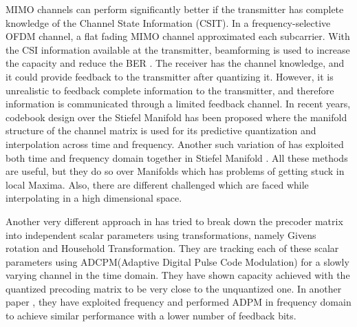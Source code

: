\documentclass[conference]{IEEEtran}
\begin{document}
MIMO channels can perform significantly better if the transmitter has complete knowledge of the Channel State Information (CSIT). In a frequency-selective OFDM channel, a flat fading MIMO channel approximated each subcarrier. With the CSI information available at the transmitter, beamforming is used to increase the capacity and reduce the BER \cite{love2008overview}. The receiver has the channel knowledge, and it could provide feedback to the transmitter after quantizing it. However, it is unrealistic to feedback complete information to the transmitter, and therefore information is communicated through a limited feedback channel. 
In recent years, codebook design over the Stiefel Manifold \cite{6891198} has been proposed where the manifold structure of the channel matrix is used for its predictive quantization and interpolation across time and frequency. Another such variation of \cite{6891198} has exploited both time and frequency domain together in Stiefel Manifold \cite{Gupt1905:Predictive}. All these methods are useful, but they do so over Manifolds which has problems of getting stuck in local Maxima. Also, there are different challenged which are faced while interpolating in a high dimensional space.

Another very different approach in \cite{4114278} has tried to break down the precoder matrix into independent scalar parameters using transformations, namely Givens rotation and Household Transformation. They are tracking each of these scalar parameters using ADCPM(Adaptive Digital Pulse Code Modulation) for a slowly varying channel in the time domain. They have shown capacity achieved with the quantized precoding matrix to be very close to the unquantized one. In another paper \cite{4556174}, they have exploited frequency and performed ADPM in frequency domain to achieve similar performance with a lower number of feedback bits.  
\end{document}
